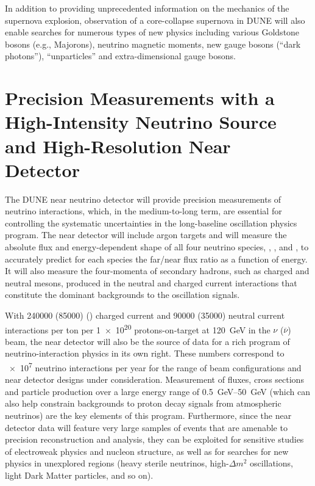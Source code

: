 In addition to providing unprecedented information on the mechanics of
the supernova explosion, observation of a core-collapse supernova in
DUNE will also enable searches for numerous types of new physics
including various Goldstone bosons (e.g., Majorons), neutrino magnetic
moments, new gauge bosons (``dark photons''), ``unparticles'' and
extra-dimensional gauge bosons.

%
%
\section{Precision Measurements with a High-Intensity Neutrino Source and High-Resolution Near Detector}


The DUNE near neutrino detector will provide precision measurements of
neutrino interactions, which, in the medium-to-long term, are essential
for controlling the systematic uncertainties in the long-baseline
oscillation physics program.  The near detector %
will include argon targets and will measure the absolute flux and energy-dependent
shape of all four neutrino species, \numu, \anumu, \nue and \anue,
to accurately predict for each species the
far/near flux ratio as a function of energy.  It will also measure the
four-momenta of secondary hadrons, such as charged and neutral mesons,
produced in the neutral and charged current interactions that
constitute the dominant backgrounds to the oscillation signals.

With  \num{240000} (\num{85000}) %
\numu (\anumu) charged current 
and \num{90000} (\num{35000})  neutral current interactions per ton per \num{1e20} %
protons-on-target at \SI{120}{GeV}  in the $\nu$ ($\overline\nu$) beam, the near detector
will also be the source of data for a rich program of neutrino-interaction 
physics in its own right.  These numbers correspond to
\num{e7}  neutrino interactions per year for the range of beam
configurations and near detector designs under consideration.
Measurement of fluxes, cross sections and particle production over a
large energy range of \SIrange{0.5}{50}{\GeV} (which can also help constrain
backgrounds to proton decay signals from atmospheric neutrinos) are the key
elements of this program.  
Furthermore, since the near detector data will feature very large
samples of events that are amenable to precision reconstruction and
analysis, they can be exploited for sensitive studies of electroweak
physics and nucleon structure, as well as for searches for new physics
in unexplored regions (heavy sterile neutrinos, high-$\Delta m^2$
oscillations, light Dark Matter particles, and so on). 

